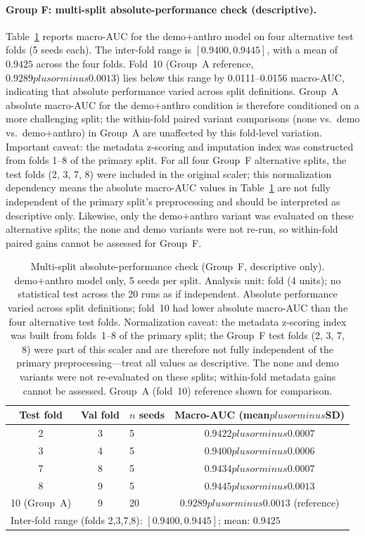 \documentclass[mathematics,article,submit,pdftex]{Definitions/mdpi}
\def\texttt#1{#1}%
\def\textbf#1{#1}%
\def\emph#1{#1}%
\def\pm{plus or minus }%
\begin{document}
\paragraph{Group F: multi-split absolute-performance check (descriptive).}
Table~\ref{tab:group_f} reports macro-AUC for the \texttt{demo+anthro} model on four alternative test folds (5 seeds each). The inter-fold range is $[0.9400, 0.9445]$, with a mean of $0.9425$ across the four folds. \textbf{Fold~10 (Group~A reference, $0.9289\pm0.0013$) lies below this range by 0.0111--0.0156 macro-AUC}, indicating that absolute performance varied across split definitions. Group~A absolute macro-AUC for the \texttt{demo+anthro} condition is therefore conditioned on a more challenging split; the within-fold paired variant comparisons (none vs.\ demo vs.\ demo+anthro) in Group~A are unaffected by this fold-level variation. \emph{Important caveat:} the metadata z-scoring and imputation index was constructed from folds 1--8 of the primary split. For all four Group~F alternative splits, the test folds (2, 3, 7, 8) were included in the original scaler; this normalization dependency means the absolute macro-AUC values in Table~\ref{tab:group_f} are not fully independent of the primary split's preprocessing and should be interpreted as descriptive only. Likewise, only the \texttt{demo+anthro} variant was evaluated on these alternative splits; the \texttt{none} and \texttt{demo} variants were not re-run, so within-fold paired gains cannot be assessed for Group~F.

\begin{table}[H]
\caption{Multi-split absolute-performance check (Group~F, descriptive only). \texttt{demo+anthro} model only, 5 seeds per split. Analysis unit: fold (4 units); no statistical test across the 20 runs as if independent. Absolute performance varied across split definitions; fold~10 had lower absolute macro-AUC than the four alternative test folds. \emph{Normalization caveat:} the metadata z-scoring index was built from folds~1--8 of the primary split; the Group~F test folds (2, 3, 7, 8) were part of this scaler and are therefore not fully independent of the primary preprocessing---treat all values as descriptive. The \texttt{none} and \texttt{demo} variants were not re-evaluated on these splits; within-fold metadata gains cannot be assessed. Group~A (fold~10) reference shown for comparison.}\label{tab:group_f}
\small\centering
\begin{tabular}{cclc}
\toprule
\textbf{Test fold} & \textbf{Val fold} & \textbf{$n$ seeds} & \textbf{Macro-AUC (mean$\pm$SD)} \\
\midrule
2 & 3 & 5 & $0.9422\pm0.0007$ \\
3 & 4 & 5 & $0.9400\pm0.0006$ \\
7 & 8 & 5 & $0.9434\pm0.0007$ \\
8 & 9 & 5 & $0.9445\pm0.0013$ \\
\midrule
10 (Group~A) & 9 & 20 & $0.9289\pm0.0013$ (reference) \\
\bottomrule
\multicolumn{4}{l}{\footnotesize Inter-fold range (folds 2,3,7,8): $[0.9400, 0.9445]$; mean: $0.9425$}\\
\end{tabular}
\end{table}
\end{document}
